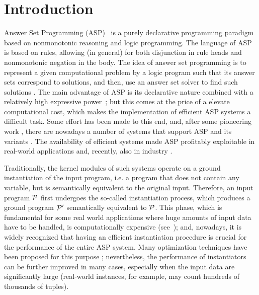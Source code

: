 \documentclass[preprint]{tlp}
\newcommand{\p}{\ensuremath{{\cal P}}\xspace}
\begin{document}
\section{Introduction}\label{sec:introduction}
Answer Set Programming (ASP)~\cite{gelf-lifs-91,eite-etal-97f,lifs-99a,mare-trus-99,bara-2002,gelf-leon-02}
is a purely declarative programming paradigm based on nonmonotonic
reasoning and logic programming.
The language of ASP is based on rules, allowing (in general)
for both disjunction in rule heads and nonmonotonic negation in the body.
The idea of answer set programming is
to represent a given computational problem by a logic program such that its
answer sets correspond to solutions, and then, use an answer set solver
to find such solutions \cite{lifs-99a}.
The main advantage of ASP is its declarative nature combined with a
relatively high expressive power~\cite{leon-etal-2002-dlv,dant-etal-01}; but this comes at
the price of a elevate computational cost, which makes the
implementation of efficient ASP systems a difficult task.
Some effort has been made to this end, and, after some pioneering work
\cite{bell-etal-94,subr-etal-95}, there are nowadays a number of
systems that support ASP and its variants
\cite{leon-etal-2002-dlv,janh-etal-2005-tocl,simo-etal-2002,gebs-etal-2007-ijcai,lin-zhao-2004,lier-mara-2004-lpnmr,ange-etal-2001}. The availability of efficient systems made ASP profitably exploitable in real-world applications \cite{lemb-etal-02b,aiel-mass-2000,bara-uyan-2001}
and, recently, also in industry \cite{Grasso-etal-2010,ielpa-etal,Grasso-etal-2011}.

Traditionally, the kernel modules of such systems operate on a ground
instantiation of the input program, i.e. a program that does not
contain any variable, but is semantically equivalent to the
original input.
Therefore, an input program $\p$ first undergoes the so-called instantiation
process, which produces a ground program $\p'$ semantically equivalent to $\p$.
This phase, which is fundamental for some real world applications where huge amounts of input data have to be handled, is computationally expensive (see~\cite{eite-etal-97f,dant-etal-01});
and, nowadays, it is widely recognized that having an efficient instantiation procedure is
crucial for the performance of the entire ASP system.
Many optimization techniques have
been proposed for this purpose
\cite{fabe-etal-99c,leon-etal-2001a,perr-etal-2004-nmr};
nevertheless, the performance of instantiators can be further improved
in many cases, especially when the input data are
significantly large (real-world instances, for example, may count
hundreds of thousands of tuples).
\end{document}
